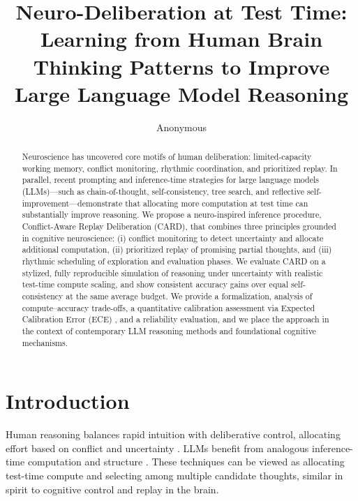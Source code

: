\documentclass[11pt]{article}
\title{Neuro-Deliberation at Test Time: Learning from Human Brain Thinking Patterns to Improve Large Language Model Reasoning}
\author{Anonymous}
\date{}
\begin{document}
\maketitle

\begin{abstract}
Neuroscience has uncovered core motifs of human deliberation: limited-capacity working memory, conflict monitoring, rhythmic coordination, and prioritized replay.
In parallel, recent prompting and inference-time strategies for large language models (LLMs)---such as chain-of-thought, self-consistency, tree search, and reflective self-improvement---demonstrate that allocating more computation at test time can substantially improve reasoning.
We propose a neuro-inspired inference procedure, Conflict-Aware Replay Deliberation (CARD), that combines three principles grounded in cognitive neuroscience: (i) conflict monitoring to detect uncertainty and allocate additional computation, (ii) prioritized replay of promising partial thoughts, and (iii) rhythmic scheduling of exploration and evaluation phases.
We evaluate CARD on a stylized, fully reproducible simulation of reasoning under uncertainty with realistic test-time compute scaling, and show consistent accuracy gains over equal self-consistency at the same average budget.
We provide a formalization, analysis of compute--accuracy trade-offs, a quantitative calibration assessment via Expected Calibration Error (ECE) \citep{Guo2017Calibration}, and a reliability evaluation, and we place the approach in the context of contemporary LLM reasoning methods and foundational cognitive mechanisms.
\end{abstract}

\section{Introduction}
Human reasoning balances rapid intuition with deliberative control, allocating effort based on conflict and uncertainty \citep{Baddeley2012WorkingMemory,Botvinick2001ConflictMonitoring,Fries2015Rhythms,Mattar2018PrioritizedReplay,Gershman2018Hippocampus}.
LLMs benefit from analogous inference-time computation and structure \citep{Wei2022CoT,Kojima2022ZeroShot,Wang2023SelfConsistency,Yao2023ToT,Yao2023ReAct,Shinn2023Reflexion,Madaan2023SelfRefine,Zelikman2022STAR,Lightman2023LetsVerify,Lewis2020RAG}.
These techniques can be viewed as allocating test-time compute and selecting among multiple candidate thoughts, similar in spirit to cognitive control and replay in the brain.
\end{document}
